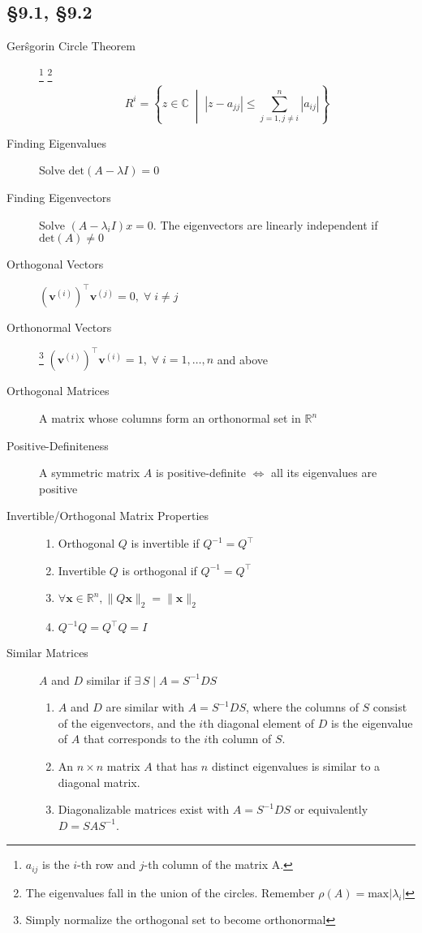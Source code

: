 \documentclass[8pt]{article}
\begin{document}

\begin{multicols}{2}
  \section{\S 9.1, \S 9.2}
  \begin{description}
  \item[Ger\^{s}gorin Circle Theorem]
    \footnote{$a_{ij}$ is the $i$-th row and $j$-th column of the matrix A.}
    \footnote{The eigenvalues fall in the union of the circles. Remember $\rho(A)=\text{max}|\lambda_i|$}
    $$R^i=\left\{z\in\mathbb{C} \;\middle|\; |z-a_{jj}|\leq\sum_{j=1,j\neq i}^{n}|a_{ij}|\right\}$$ 
  \item[Finding Eigenvalues] Solve $\mathrm{det}(A-\lambda I)=0$
  \item[Finding Eigenvectors] Solve $(A-\lambda_iI)x=0$. The
    eigenvectors are linearly independent if $\mathrm{det}(A)\neq 0$
  \item[Orthogonal Vectors]
    $(\mathbf{v}^{(i)})^\top\mathbf{v}^{(j)}=0, \;\forall\; i\neq j$
  \item[Orthonormal Vectors]
    \footnote{Simply normalize the orthogonal set to become orthonormal}
    $(\mathbf{v}^{(i)})^\top\mathbf{v}^{(i)}=1, \;\forall\; i=1,\dots,n$ and above
  \item[Orthogonal Matrices]
    A matrix whose columns form an orthonormal set in $\mathbb{R}^n$
  \item[Positive-Definiteness] A symmetric matrix $A$ is positive-definite $\iff$ all its eigenvalues are positive
  \item[Invertible/Orthogonal Matrix Properties] \hfill
    \begin{enumerate}[i]
    \item Orthogonal $Q$ is invertible if $Q^{-1}=Q^\top$
    \item Invertible $Q$ is orthogonal if $Q^{-1}=Q^\top$
    \item $\forall\mathbf{x} \in \mathbb{R}^n,\|Q\mathbf{x}\|_2=\|\mathbf{x}\|_2$
    \item $Q^{-1}Q=Q^\top Q=I$
    \end{enumerate}
  \item[Similar Matrices] $A$ and $D$ similar if $\exists\,S\;|\;A=S^{-1}DS$
    \begin{enumerate}[i]
    \item $A$ and $D$ are similar with $A = S^{−1}DS$, where the
      columns of $S$ consist of the eigenvectors, and the $i$th
      diagonal element of $D$ is the eigenvalue of $A$ that
      corresponds to the $i$th column of $S$.
    \item An $n\times n$ matrix $A$ that has $n$ distinct eigenvalues is
      similar to a diagonal matrix.
    \item Diagonalizable matrices exist with $A=S^{-1}DS$ or equivalently $D=SAS^{-1}$.
    \end{enumerate}
  \end{description}
\end{multicols}
\end{document}
